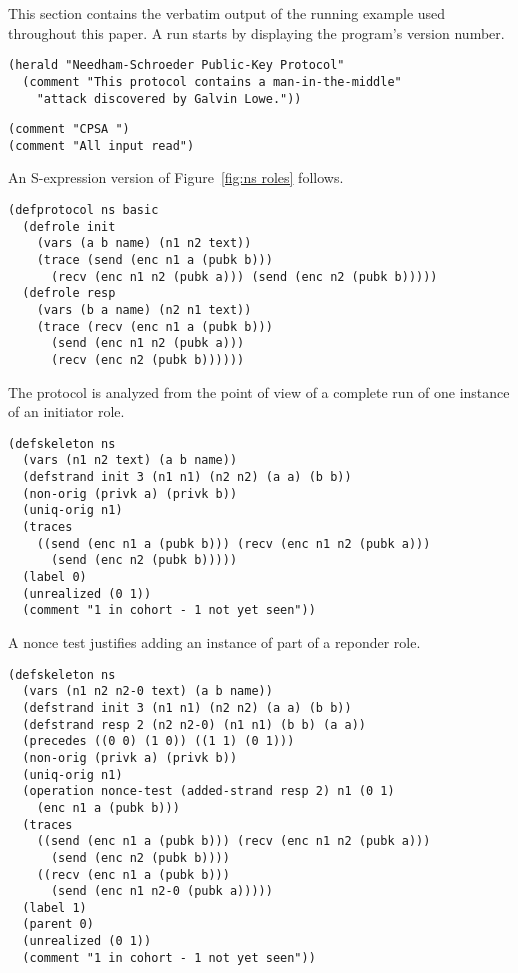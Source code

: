 \documentclass[12pt]{article}
\begin{document}

This section contains the verbatim output of the running example used
throughout this paper.  A run starts by displaying the program's
version number.

\begin{verbatim}
(herald "Needham-Schroeder Public-Key Protocol"
  (comment "This protocol contains a man-in-the-middle"
    "attack discovered by Galvin Lowe."))
\end{verbatim}

\begin{flushleft}
\texttt{(comment "CPSA {\version}")}\\
\texttt{(comment "All input read")}
\end{flushleft}

An S-expression version of Figure~\ref{fig:ns roles} follows.

\begin{verbatim}
(defprotocol ns basic
  (defrole init
    (vars (a b name) (n1 n2 text))
    (trace (send (enc n1 a (pubk b)))
      (recv (enc n1 n2 (pubk a))) (send (enc n2 (pubk b)))))
  (defrole resp
    (vars (b a name) (n2 n1 text))
    (trace (recv (enc n1 a (pubk b)))
      (send (enc n1 n2 (pubk a)))
      (recv (enc n2 (pubk b))))))
\end{verbatim}

The protocol is analyzed from the point of view of a complete run of
one instance of an initiator role.

\begin{verbatim}
(defskeleton ns
  (vars (n1 n2 text) (a b name))
  (defstrand init 3 (n1 n1) (n2 n2) (a a) (b b))
  (non-orig (privk a) (privk b))
  (uniq-orig n1)
  (traces
    ((send (enc n1 a (pubk b))) (recv (enc n1 n2 (pubk a)))
      (send (enc n2 (pubk b)))))
  (label 0)
  (unrealized (0 1))
  (comment "1 in cohort - 1 not yet seen"))
\end{verbatim}

A nonce test justifies adding an instance of part of a reponder role.

\begin{verbatim}
(defskeleton ns
  (vars (n1 n2 n2-0 text) (a b name))
  (defstrand init 3 (n1 n1) (n2 n2) (a a) (b b))
  (defstrand resp 2 (n2 n2-0) (n1 n1) (b b) (a a))
  (precedes ((0 0) (1 0)) ((1 1) (0 1)))
  (non-orig (privk a) (privk b))
  (uniq-orig n1)
  (operation nonce-test (added-strand resp 2) n1 (0 1)
    (enc n1 a (pubk b)))
  (traces
    ((send (enc n1 a (pubk b))) (recv (enc n1 n2 (pubk a)))
      (send (enc n2 (pubk b))))
    ((recv (enc n1 a (pubk b)))
      (send (enc n1 n2-0 (pubk a)))))
  (label 1)
  (parent 0)
  (unrealized (0 1))
  (comment "1 in cohort - 1 not yet seen"))
\end{verbatim}
\end{document}
